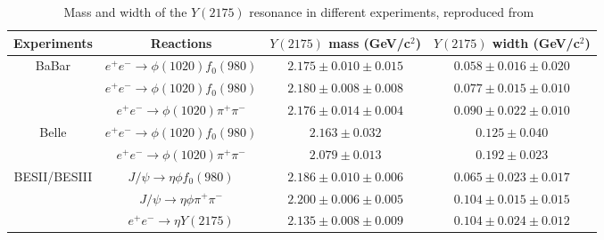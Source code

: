 \begin{table}[H]
    \centering
    \small
    \setlength{\tabcolsep}{3pt}
    \caption{Mass and width of the $Y(2175)$ resonance in different experiments, reproduced from~\cite{Aubert06, Aubert12, Shen09, Ablikim08, Ablikim15, Ablikim19}}
    \label{tab.1.4}
    \begin{tabular}{|c|c|c|c|}
        \hline
        Experiments & Reactions & \thead{$Y(2175)$ mass\\(GeV/c$^2$)} & \thead{$Y(2175)$ width \\(GeV/c$^2$)} \\
        \hline
        \multirow{3}{*}{BaBar} 
        & $e^{+}e^{-}\rightarrow \phi(1020)f_0(980)$ & $2.175 \pm 0.010 \pm 0.015$ & $0.058 \pm 0.016 \pm 0.020$ \\ 
        & $e^{+}e^{-}\rightarrow \phi(1020)f_0(980)$ & $2.180 \pm 0.008 \pm 0.008$ & $0.077 \pm 0.015 \pm 0.010$ \\ 
        & $e^{+}e^{-}\rightarrow \phi(1020)\pi^{+}\pi^{-}$ & $2.176 \pm 0.014 \pm 0.004$ & $0.090 \pm 0.022 \pm 0.010$ \\ 
        \hline
        \multirow{2}{*}{Belle}
        & $e^{+}e^{-}\rightarrow \phi(1020)f_0(980)$ & $2.163 \pm 0.032$ & $0.125 \pm 0.040$ \\ 
        & $e^{+}e^{-}\rightarrow \phi(1020)\pi^{+}\pi^{-}$ & $2.079 \pm 0.013$ & $0.192 \pm 0.023$ \\
        \hline
        \multirow{2}{*}{BESII/BESIII}
        & $J/\psi \rightarrow \eta \phi f_0(980)$ & $2.186 \pm 0.010 \pm 0.006$ & $0.065 \pm 0.023 \pm 0.017$ \\ 
        & $J/\psi \rightarrow \eta \phi \pi^{+}\pi^{-}$ & $2.200 \pm 0.006 \pm 0.005$ & $0.104 \pm 0.015 \pm 0.015$ \\ 
        & $e^{+}e^{-}\rightarrow \eta Y(2175)$ & $2.135 \pm 0.008 \pm 0.009$ & $0.104 \pm 0.024 \pm 0.012$ \\ 
        \hline
    \end{tabular}
\end{table}